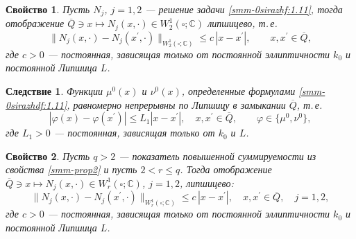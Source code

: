 \documentclass[a4paper,12pt]{article}
\newtheorem{property}{Свойство}
\newtheorem{corollary}{Следствие}[theorem]
\theoremstyle{definition}
\begin{document}
\begin{property}\label{smm-prop3}
{Пусть $N_j$, $j=1,2$ --- решение задачи \eqref{smm-0sirazhf:1.11}, тогда отображение
	$\overline{Q}\ni x \mapsto  N_j(x,\cdot)\in W_2^1(\square;\mathbb{C})$ липшицево, т.\,е.
	\begin{equation}\label{smm-0sirazhdf:1.16}
		\|N_j(x,\cdot)-N_j(x^\prime,\cdot)\|_{W_2^1(\square;\mathbb{C})}\leqslant c\,|x-x^\prime|,
		\qquad x,x^\prime\in\overline{Q},
	\end{equation}
	где $c>0$ --- постоянная, зависящая только от постоянной эллиптичности $k_0$
	и постоянной Липшица $L$.}
\end{property}

\begin{corollary}
{Функции $\mu^0 (x)$ и $\nu^0(x)$, определенные формулами \eqref{smm-0sirazhdf:1.11},
	равномерно непрерывны по Липшицу в замыкании $\overline{Q}$, т.\,е.
	\begin{equation*}
		|\varphi(x)-\varphi(x^\prime)|\leqslant L_1|x-x^\prime|,\quad x,x^\prime\in\overline{Q},\qquad
		\varphi\in\{\mu^0,\nu^0\},
	\end{equation*}
	где  $L_1>0$ --- постоянная, зависящая только от $k_0$ и $L$.}
\end{corollary}

\begin{property}\label{smm-prop4}
{Пусть $q>2$ --- показатель повышенной суммируемости из
	свойства \ref{smm-prop2}  и пусть $2<r\leqslant q$. Тогда отображение $\overline{Q}\ni x \mapsto  N_j(x,\cdot)\in W_r^1(\square;\mathbb{C})$, $j=1,2$,
	липшицево:
	\begin{equation}\label{smm-0sirazhdf:21}
		\|N_j(x,\cdot)-N_j(x^\prime,\cdot)\|_{W_r^1(\square;\mathbb{C})}\leqslant c\,|x-x^\prime|,\quad x,x^\prime\in\overline{Q},\quad
		j=1,2,
	\end{equation}
	где $c>0$ --- постоянная, зависящая только от постоянной эллиптичности $k_0$ и постоянной Липшица $L$}.
\end{property}
\end{document}
